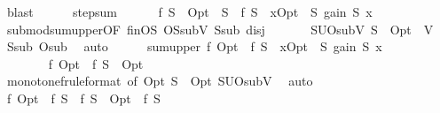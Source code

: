 \begin{isabellebody}
\ blast\isanewline
\isanewline
\ \ \ \ \isamarkupfalse%
\ step{\isacharunderscore}{\kern0pt}sum{\isacharcolon}{\kern0pt}\isanewline
\ \ \ \ \ \ {\isachardoublequoteopen}f\ {\isacharparenleft}{\kern0pt}S\ {\isasymunion}\ {\isacharparenleft}{\kern0pt}Opt\ {\isacharminus}{\kern0pt}\ S{\isacharparenright}{\kern0pt}{\isacharparenright}{\kern0pt}\ {\isacharminus}{\kern0pt}\ f\ S\ {\isasymle}\ {\isacharparenleft}{\kern0pt}{\isasymSum}x{\isasymin}Opt\ {\isacharminus}{\kern0pt}\ S{\isachardot}{\kern0pt}\ gain\ S\ x{\isacharparenright}{\kern0pt}{\isachardoublequoteclose}\isanewline
\ \ \ \ \ \ \isamarkupfalse%
\ submod{\isacharunderscore}{\kern0pt}sum{\isacharunderscore}{\kern0pt}upper{\isacharbrackleft}{\kern0pt}OF\ finOS\ OS{\isacharunderscore}{\kern0pt}subV\ S{\isacharunderscore}{\kern0pt}sub\ disj{\isacharbrackright}{\kern0pt}\ \isakeywordONE{{\isachardot}{\kern0pt}}\isamarkupfalse%
\isanewline
\isanewline
\ \ \ \ \isamarkupfalse%
\ SUO{\isacharunderscore}{\kern0pt}subV{\isacharcolon}{\kern0pt}\ {\isachardoublequoteopen}S\ {\isasymunion}\ Opt\ {\isasymsubseteq}\ V{\isachardoublequoteclose}\ \isamarkupfalse%
\ S{\isacharunderscore}{\kern0pt}sub\ O{\isacharunderscore}{\kern0pt}sub\ \isamarkupfalse%
\ auto\isanewline
\ \ \ \ \isamarkupfalse%
\ sum{\isacharunderscore}{\kern0pt}upper{\isacharcolon}{\kern0pt}\ {\isachardoublequoteopen}f\ Opt\ {\isacharminus}{\kern0pt}\ f\ S\ {\isasymle}\ {\isacharparenleft}{\kern0pt}{\isasymSum}x{\isasymin}Opt\ {\isacharminus}{\kern0pt}\ S{\isachardot}{\kern0pt}\ gain\ S\ x{\isacharparenright}{\kern0pt}{\isachardoublequoteclose}\isanewline
\ \ \ \ \isamarkupfalse%
\ {\isacharminus}{\kern0pt}\isanewline
\ \ \ \ \ \ \isamarkupfalse%
\ {\isachardoublequoteopen}f\ Opt\ {\isasymle}\ f\ {\isacharparenleft}{\kern0pt}S\ {\isasymunion}\ Opt{\isacharparenright}{\kern0pt}{\isachardoublequoteclose}\isanewline
\ \ \ \ \ \ \ \ \isamarkupfalse%
\ monotone{\isacharunderscore}{\kern0pt}f{\isacharbrackleft}{\kern0pt}rule{\isacharunderscore}{\kern0pt}format{\isacharcomma}{\kern0pt}\ of\ Opt\ {\isachardoublequoteopen}S\ {\isasymunion}\ Opt{\isachardoublequoteclose}{\isacharbrackright}{\kern0pt}\ SUO{\isacharunderscore}{\kern0pt}subV\ \isamarkupfalse%
\ auto\isanewline
\ \ \ \ \ \ \isamarkupfalse%
\ \isamarkupfalse%
\ {\isachardoublequoteopen}f\ Opt\ {\isacharminus}{\kern0pt}\ f\ S\ {\isasymle}\ f\ {\isacharparenleft}{\kern0pt}S\ {\isasymunion}\ Opt{\isacharparenright}{\kern0pt}\ {\isacharminus}{\kern0pt}\ f\ S{\isachardoublequoteclose}\ \isamarkupfalse%

\end{isabellebody}
